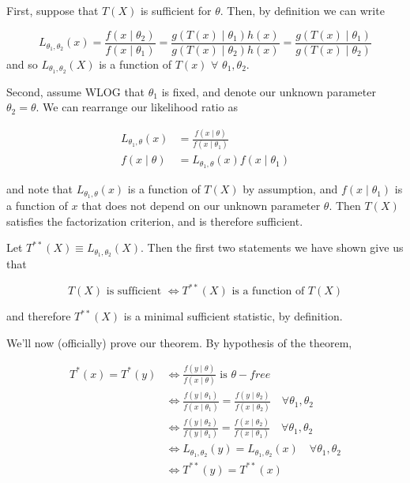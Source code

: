\documentclass[
  letterpaper,
  DIV=11,
  numbers=noendperiod]{scrreprt}
\begin{document}
First, suppose that \(T(X)\) is sufficient for \(\theta\). Then, by
definition we can write

\[
L_{\theta_1, \theta_2}(x) = \frac{f(x \mid \theta_2)}{f(x \mid \theta_1)} = \frac{g(T(x) \mid \theta_1)h(x)}{g(T(x) \mid \theta_2)h(x)} = \frac{g(T(x) \mid \theta_1)}{g(T(x) \mid \theta_2)}
\] and so \(L_{\theta_1, \theta_2}(X)\) is a function of \(T(x)\)
\(\forall\) \(\theta_1, \theta_2\).

Second, assume WLOG that \(\theta_1\) is fixed, and denote our unknown
parameter \(\theta_2 = \theta\). We can rearrange our likelihood ratio
as

\begin{align*}
    L_{\theta_1, \theta}(x) & = \frac{f(x \mid \theta)}{f(x \mid \theta_1)} \\
    f(x \mid \theta) & = L_{\theta_1, \theta}(x) f(x \mid \theta_1) 
\end{align*}

and note that \(L_{\theta_1, \theta}(x)\) is a function of \(T(X)\) by
assumption, and \(f(x \mid \theta_1)\) is a function of \(x\) that does
not depend on our unknown parameter \(\theta\). Then \(T(X)\) satisfies
the factorization criterion, and is therefore sufficient.

Let \(T^{**}(X) \equiv L_{\theta_1, \theta_2}(X)\). Then the first two
statements we have shown give us that

\[
T(X) \text{ is sufficient } \iff T^{**}(X) \text{ is a function of } T(X)
\]

and therefore \(T^{**}(X)\) is a minimal sufficient statistic, by
definition.

We'll now (officially) prove our theorem. By hypothesis of the theorem,

\begin{align*}
    T^*(x) = T^*(y) & \iff \frac{f(y \mid \theta)}{f(x \mid \theta)} \text{ is } \theta-free \\
    & \iff \frac{f(y \mid \theta_1)}{f(x \mid \theta_1)} = \frac{f(y \mid \theta_2)}{f(x \mid \theta_2)} \quad \forall \theta_1, \theta_2 \\
    & \iff \frac{f(y \mid \theta_2)}{f(y \mid \theta_1)} = \frac{f(x \mid \theta_2)}{f(x \mid \theta_1)} \quad \forall \theta_1, \theta_2 \\
    & \iff L_{\theta_1, \theta_2}(y) = L_{\theta_1, \theta_2} (x) \quad \forall \theta_1, \theta_2 \\
    & \iff T^{**}(y) = T^{**}(x)
\end{align*}
\end{document}
